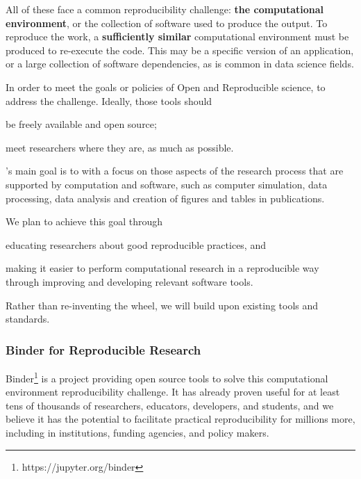 All of these face a common reproducibility challenge: \textbf{the computational environment},
or the collection of software used to produce the output.
To reproduce the work, a \textbf{sufficiently similar} computational environment must be produced to re-execute the code.
This may be a specific version of an application, or a large collection of software dependencies,
as is common in data science fields.

In order to meet the goals or policies of Open and Reproducible science,
 to address the challenge. Ideally, those tools should
\begin{compactenum}
\item be freely available and open source;
\item meet researchers where they are, as much as possible.
\end{compactenum}

\TheProject's main goal is to  with a focus on those aspects of the research process that
are supported by computation and software, such as computer simulation, data
processing, data analysis and creation of figures and tables in publications.

We plan to achieve this goal through
\begin{compactitem}
\item educating researchers about good reproducible practices, and
\item making it easier to perform computational research in a reproducible way
  through improving and developing relevant software tools.
\end{compactitem}

Rather than re-inventing the wheel, we will build upon existing tools and standards.

\subsubsection{Binder for Reproducible Research}
\label{sec:reproducibility-example}

Binder\footnote{https://jupyter.org/binder} is a project providing open source tools to solve this computational environment reproducibility challenge.
It has already proven useful for at least tens of thousands of researchers, educators, developers, and students,
and we believe it has the potential to facilitate practical reproducibility for millions more,
including in institutions, funding agencies, and policy makers.

